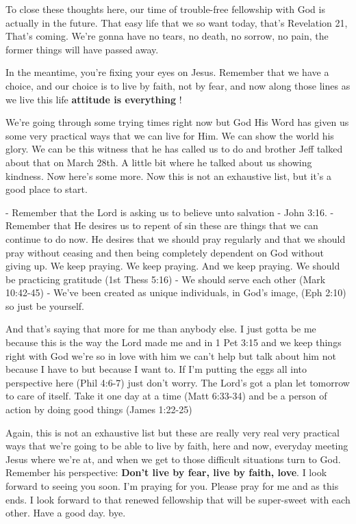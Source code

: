\documentclass[11pt]{article} %
\begin{document}
To close these thoughts here, our time of trouble-free fellowship with God is actually in the future.
That easy life that we so want today, that's Revelation 21, That's coming.  We're gonna have
no tears, no death, no sorrow, no pain, the former things will have passed away.

In the meantime, you're fixing your eyes on Jesus.  Remember that we have a choice, and our
choice is to live by faith, not by fear, and now along those lines as we live this life 
\textbf{attitude is everything} !

We're going through some trying times right now but God His Word has given us some
very practical ways that we can live for Him.  We can show the world his glory. We can be
this witness that he has called us to do and brother Jeff talked about that on March 28th.
A little bit where he talked about us showing kindness. Now here's some more.
Now this is not an exhaustive list, but it's a good place to start. 

- Remember that the Lord is asking us to believe unto salvation - John 3:16. 
- Remember that He desires us to repent of sin these are things that we can continue to do now.
He desires that we should pray regularly and that we should pray without ceasing and then being
completely dependent on God without giving up. We keep praying. We keep praying. And we
keep praying. We should be practicing gratitude (1st Thess 5:16) 
- We should serve each other (Mark 10:42-45)
- We've been created as unique individuals, in God's image, (Eph 2:10) so just be yourself.

And that's saying that more for me than anybody else. I just gotta be me because this is the way
the Lord made me and in 1 Pet 3:15 and we keep things right with God we're so in love with him we
can't help but talk about him not because I have to but because I want to. If I'm putting the eggs all
into perspective here (Phil 4:6-7) just don't worry. The Lord's got a plan let tomorrow to care of itself.
Take it one day at a time (Matt 6:33-34) and be a person of action by doing good things (James 1:22-25)

Again, this is not an exhaustive list but these are really very real very practical ways that we're going to
be able to live by faith, here and now, everyday meeting Jesus where we're at, and when we get to
those difficult situations turn to God. Remember his perspective: \textbf{Don't live by fear, live by faith, love}.
I look forward to seeing you soon. I'm praying for you. Please pray for me and as this ends. I look forward
to that renewed fellowship that will be super-sweet with each other. Have a good day. bye.
\end{document}
